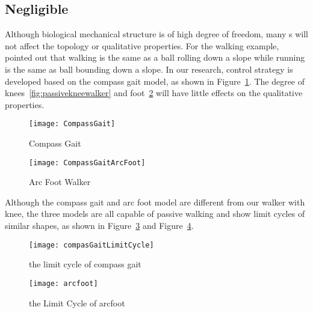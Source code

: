 {\subsection{Negligible \dof}
Although biological mechanical structure is of high degree of freedom, many {\dof}s will not affect the topology or qualitative properties.
For the walking example, \citet{Raibert1986} pointed out that walking is the same as a ball rolling down a slope while running is the same as ball bounding down a slope.
In our research, control strategy is developed based on the compass gait model, as shown in Figure~\ref{fig:compassgait}.
The degree of knees~\ref{fig:passivekneewalker} and foot~\ref{fig:arcfoot} will have little effects on the qualitative properties.
\begin{figure}[!htbp]
  \begin{center}
      \texttt{[image: CompassGait]}
    \caption{Compass Gait}
    \label{fig:compassgait}
\end{center}
\end{figure}



\begin{figure}[!htbp]
  \begin{center}
      \texttt{[image: CompassGaitArcFoot]}
    \caption{Arc Foot Walker}
    \label{fig:arcfoot}
\end{center}
\end{figure}






Although the compass gait and arc foot model are different from  our walker with knee, the three models are all capable of passive walking and show limit cycles of similar shapes, as shown in Figure~\ref{fig:compassgaitlimitcycle} and Figure~\ref{fig:arcfootlimitcycle}.
\begin{figure}[!htbp]
  \begin{center}
      \texttt{[image: compasGaitLimitCycle]}
    \caption{the limit cycle of compass gait}
    \label{fig:compassgaitlimitcycle}
\end{center}
\end{figure}

\begin{figure}[!htbp]
  \begin{center}
      \texttt{[image: arcfoot]}
    \caption{the Limit Cycle of arcfoot}
    \label{fig:arcfootlimitcycle}
\end{center}
\end{figure}


}
